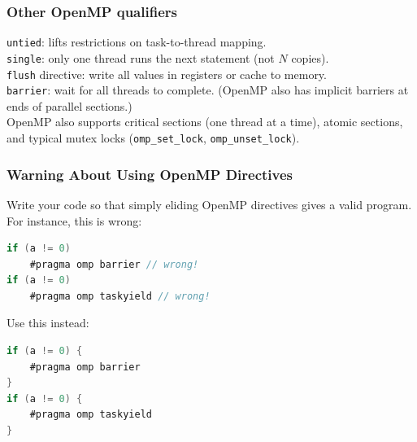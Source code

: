 \begin{frame}[fragile]
  \frametitle{Other OpenMP qualifiers}

  
    {\tt untied}: lifts restrictions on task-to-thread mapping.\\[1em]

    {\tt single}: only one thread runs the next statement (not $N$ copies).\\[1em]

    {\tt flush} directive: write all values in registers or cache to memory.\\[1em]

    {\tt barrier}: wait for all threads to complete. (OpenMP also has implicit
barriers at ends of parallel sections.)\\[1em]

    OpenMP also supports critical sections (one thread at a time), atomic
 sections, and typical mutex locks (\verb+omp_set_lock+,
 \verb+omp_unset_lock+).
  

\end{frame}

\begin{frame}[fragile]
  \frametitle{Warning About Using OpenMP Directives}

  

  Write your code so that simply eliding OpenMP directives gives a valid program.\\[1em]

  For instance, this is wrong:
  \begin{lstlisting}[language=C,morekeywords={foreach,pragma,omp,parallel,single,nowait,task,untied,barrier,taskyield}]
if (a != 0)
    #pragma omp barrier // wrong!
if (a != 0)
    #pragma omp taskyield // wrong!
  \end{lstlisting}

  Use this instead:
  \begin{lstlisting}[language=C,morekeywords={foreach,pragma,omp,parallel,single,nowait,task,untied,barrier,taskyield}]
if (a != 0) {
    #pragma omp barrier
}
if (a != 0) {
    #pragma omp taskyield
}
  \end{lstlisting}
  

\end{frame}




